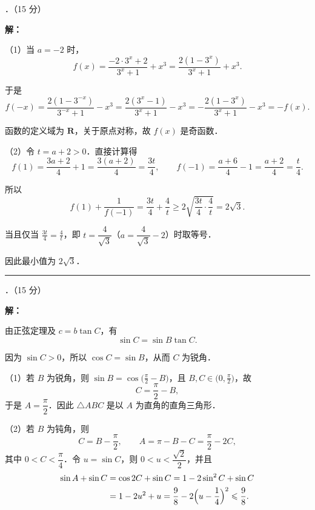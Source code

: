 \documentclass[a4paper,12pt]{ctexart}
\begin{document}
\vspace{0.4cm}
{．（15 分）}

\textbf{解：}

（1）当 $a = -2$ 时，
\[
f(x) = \frac{-2 \cdot 3^{x} + 2}{3^{x} + 1} + x^{3}
     = \frac{2(1 - 3^{x})}{3^{x} + 1} + x^{3}.
\]

于是
\[
f(-x) = \frac{2(1 - 3^{-x})}{3^{-x} + 1} - x^{3}
      = \frac{2(3^{x} - 1)}{3^{x} + 1} - x^{3}
      = -\frac{2(1 - 3^{x})}{3^{x} + 1} - x^{3}
      = -f(x).
\]

函数的定义域为 $\mathbf{R}$，关于原点对称，故 $f(x)$ 是奇函数．

（2）令 $t = a + 2 > 0$．直接计算得
\[
f(1)  = \frac{3a + 2}{4} + 1 = \frac{3(a + 2)}{4} = \frac{3t}{4},
\qquad
f(-1) = \frac{a + 6}{4} - 1 = \frac{a + 2}{4} = \frac{t}{4}.
\]

所以
\[
f(1) + \frac{1}{f(-1)}
   = \frac{3t}{4} + \frac{4}{t}
   \geqslant 2\sqrt{\frac{3t}{4} \cdot \frac{4}{t}}
   = 2\sqrt{3}.
\]

当且仅当 $\displaystyle\frac{3t}{4} = \frac{4}{t}$，即 $t = \dfrac{4}{\sqrt{3}}$（$a = \dfrac{4}{\sqrt{3}} - 2$）时取等号．

因此最小值为 $2\sqrt{3}$．

\vspace{0.2cm}
{\small\noindent\rule{\textwidth}{0.2pt}}

\vspace{0.4cm}
{．（15 分）}

\textbf{解：}

由正弦定理及 $c = b\tan C$，有
\[
\sin C = \sin B \tan C.
\]

因为 $\sin C > 0$，所以 $\cos C = \sin B$，从而 $C$ 为锐角．

（1）若 $B$ 为锐角，则 $\sin B = \cos\bigl(\frac{\pi}{2} - B\bigr)$，且 $B, C \in \bigl(0, \frac{\pi}{2}\bigr)$，故
\[
C = \frac{\pi}{2} - B,
\]
于是 $A = \dfrac{\pi}{2}$．因此 $\triangle ABC$ 是以 $A$ 为直角的直角三角形．

（2）若 $B$ 为钝角，则
\[
C = B - \frac{\pi}{2},\qquad
A = \pi - B - C = \frac{\pi}{2} - 2C,
\]
其中 $0 < C < \dfrac{\pi}{4}$．令 $u = \sin C$，则 $0 < u < \dfrac{\sqrt{2}}{2}$，并且
\begin{align*}
\sin A + \sin C &= \cos 2C + \sin C
                 = 1 - 2\sin^{2}C + \sin C \\
               &= 1 - 2u^{2} + u
                 = \frac{9}{8} - 2\Bigl(u - \frac{1}{4}\Bigr)^{2}
                 \leqslant \frac{9}{8}.
\end{align*}
\end{document}
